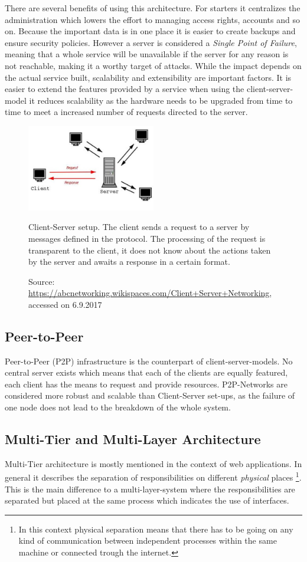 There are several benefits of using this architecture. For starters it centralizes the administration which lowers the effort to managing access rights, accounts and so on. Because the important data is in one place it is easier to create backups and ensure security policies. However a server is considered a \emph{Single Point of Failure}, meaning that a whole service will be unavailable if the server for any reason is not reachable, making it a worthy target of attacks. While the impact depends on the actual service built, scalability and extensibility are important factors. It is easier to extend the features provided by a service when using the client-server-model it reduces scalability as the hardware needs to be upgraded from time to time to meet a increased number of requests directed to the server.
\begin{figure}[htbp]
	\centering
	\includegraphics[width=0.5\textwidth]{./content/pictures/client-server.jpg}
	\caption{Client-Server setup. The client sends a request to a server by messages defined in the protocol. The processing of the request is transparent to the client, it does not know about the actions taken by the server and awaits a response in a certain format.}
	\caption*{Source: \href{https://abcnetworking.wikispaces.com/Client+Server+Networking}{https://abcnetworking.wikispaces.com/Client+Server+Networking}, accessed on 6.9.2017}
\end{figure}

\subsection{Peer-to-Peer}
Peer-to-Peer (P2P) infrastructure is the counterpart of client-server-models. No central server exists which means that each of the clients are equally featured, each client has the means to request and provide resources. P2P-Networks are considered more robust and scalable than Client-Server set-ups, as the failure of one node does not lead to the breakdown of the whole system.

\subsection{Multi-Tier and Multi-Layer Architecture}
\label{sec:multi-tier}
Multi-Tier architecture is mostly mentioned in the context of web applications. In general it describes the separation of responsibilities on different \emph{physical} places \footnote{In this context physical separation means that there has to be going on any kind of communication between independent processes within the same machine or connected trough the internet.}. This is the main difference to a multi-layer-system where the responsibilities are separated but placed at the same process which indicates the use of interfaces. 

